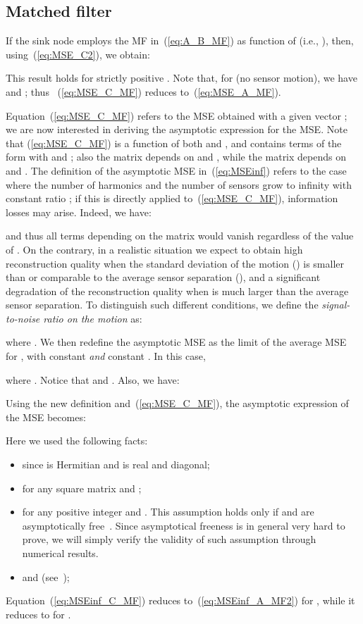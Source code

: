 \documentclass[final, a4paper]{IEEEtran}
\begin{document}
\subsection{Matched filter}
\label{sec:MF_B}
If the sink node employs the MF in~(\ref{eq:A_B_MF})
as function of  (i.e., ),
then, using~(\ref{eq:MSE_C2}), we obtain:

This result holds for strictly positive . Note that, for
 (no sensor motion), we have  and ;
thus ~(\ref{eq:MSE_C_MF}) reduces to~(\ref{eq:MSE_A_MF}).

Equation~(\ref{eq:MSE_C_MF}) refers to the MSE obtained with a given
vector ; we are now interested in deriving the asymptotic
expression for the MSE.
Note that (\ref{eq:MSE_C_MF}) is a function of both  and , and
contains terms of the form
 with  and ;
also the matrix  depends on  and , while the matrix
 depends on  and .
The definition of the asymptotic MSE in~(\ref{eq:MSEinf}) refers to
the case where the number of harmonics  and the number of sensors  grow
to infinity with constant ratio ; if this is directly applied
to~(\ref{eq:MSE_C_MF}), information losses may arise. Indeed, we
have:

and thus all terms depending on the matrix  would vanish
regardless of the value of . On the contrary, in a
realistic situation we expect to obtain high reconstruction quality
when the standard deviation of the motion () is
smaller than or comparable to the average sensor separation (),
and a significant degradation of the reconstruction quality when
 is much larger than the average sensor separation.
To distinguish such different conditions, we define the {\em
signal-to-noise ratio on the motion} as:

where .
We then redefine the asymptotic MSE as the limit of the average MSE
for , with constant  {\em and} constant
.
In this case,

where . Notice that  and
.
Also,  we have:


Using the new definition and~(\ref{eq:MSE_C_MF}), the asymptotic expression of the MSE
becomes:

Here we used the following facts:
\begin{itemize}
\item  since  is Hermitian and  is real and diagonal;
\item  for any square matrix  and ;
\item  for any positive integer  and .
This assumption holds only if  and  are asymptotically free~\cite{TulinoVerdu}.
Since asymptotical freeness is in general very hard to prove, we will simply verify the validity
of such assumption through numerical results.
\item  and  (see~\cite{NordioChiasseriniViterbo});
\end{itemize}
Equation~(\ref{eq:MSEinf_C_MF}) reduces to~(\ref{eq:MSEinf_A_MF2}) for ,
while it reduces to  for .
\end{document}
